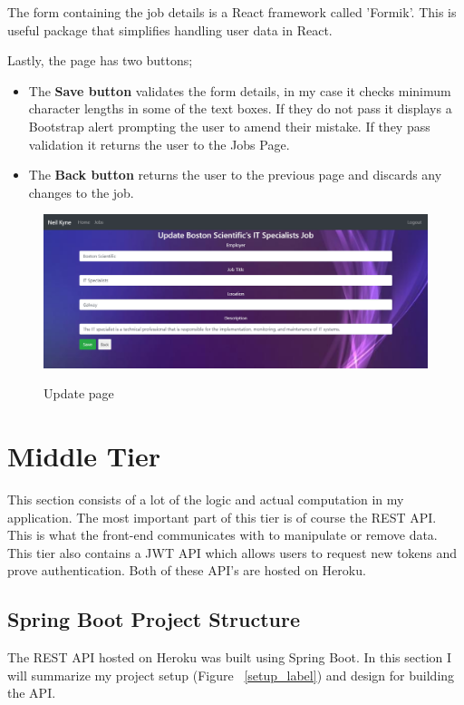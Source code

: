 The form containing the job details is a React framework called 'Formik'. This is useful package that simplifies handling user data in React.

Lastly, the page has two buttons;
\begin{itemize}
    \item The \textbf{Save button} validates the form details, in my case it checks minimum character lengths in some of the text boxes. If they do not pass it displays a Bootstrap alert prompting the user to amend their mistake. If they pass validation it returns the user to the Jobs Page.
    \item The \textbf{Back button} returns the user to the previous page and discards any changes to the job.
\end{itemize}
\begin{figure}[ht]
    \centering
    \includegraphics[scale=0.3]{Images/update.png} 
    \label{update_label}
    \caption{Update page}
\end{figure}

\section{Middle Tier}
This section consists of a lot of the logic and actual computation in my application. The most important part of this tier is of course the REST API. This is what the front-end communicates with to manipulate or remove data. This tier also contains a JWT API which allows users to request new tokens and prove authentication. Both of these API's are hosted on Heroku.

\subsection{Spring Boot Project Structure}
The REST API hosted on Heroku was built using Spring Boot. In this section I will summarize my project setup (Figure ~\ref{setup_label}) and design for building the API.

